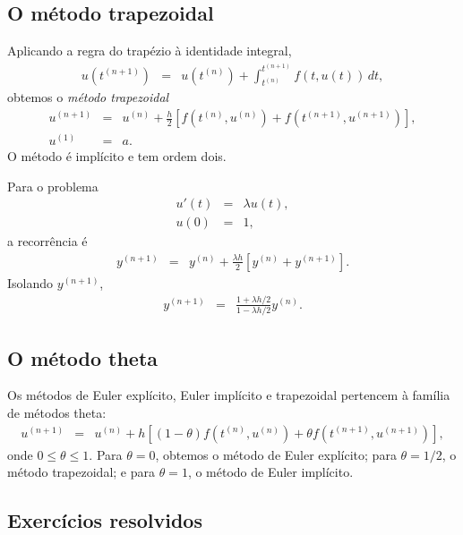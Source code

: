 \subsection{O método trapezoidal}\label{sec:trapezoidal}
Aplicando a regra do trapézio à identidade integral,
\begin{eqnarray}
u(t^{(n+1)})&=&u(t^{(n)})+\int_{t^{(n)}}^{t^{(n+1)}}f(t,u(t))\,dt,
\end{eqnarray}
obtemos o \emph{método trapezoidal}
\begin{eqnarray}
u^{(n+1)}&=&u^{(n)}+\frac{h}{2}\left[f(t^{(n)},u^{(n)})+
f(t^{(n+1)},u^{(n+1)})\right],\\
u^{(1)}&=&a.
\end{eqnarray}
O método é implícito e tem ordem dois.

\begin{ex}
Para o problema
\begin{eqnarray}
u'(t)&=&\lambda u(t),\\
u(0)&=&1,
\end{eqnarray}
a recorrência é
\begin{eqnarray}
 y^{(n+1)}&=&y^{(n)}+\frac{\lambda h}{2}\left[y^{(n)}+y^{(n+1)}\right].
\end{eqnarray}
Isolando $y^{(n+1)}$,
\begin{eqnarray}
 y^{(n+1)}&=&\frac{1+\lambda h/2}{1-\lambda h/2}y^{(n)}.
\end{eqnarray}
\end{ex}

\subsection{O método theta}
Os métodos de Euler explícito, Euler implícito e trapezoidal pertencem à família de métodos theta:
\begin{eqnarray}
u^{(n+1)}&=&u^{(n)}+h\left[(1-\theta)f(t^{(n)},u^{(n)})
+\theta f(t^{(n+1)},u^{(n+1)})\right],
\end{eqnarray}
onde $0\leq\theta\leq1$. Para $\theta=0$, obtemos o método de Euler explícito; para $\theta=1/2$, o método trapezoidal; e para $\theta=1$, o método de Euler implícito.

\subsection*{Exercícios resolvidos}

